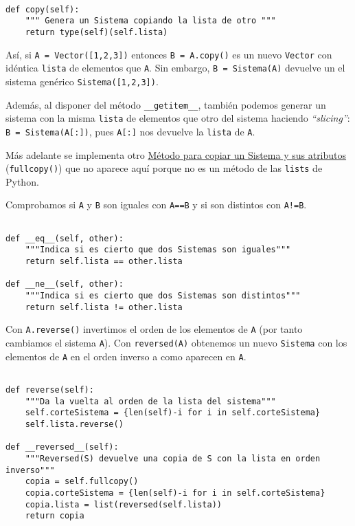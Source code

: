 \documentclass[11pt]{report}
\begin{document}
\begin{verbatim}

def copy(self):
    """ Genera un Sistema copiando la lista de otro """
    return type(self)(self.lista)

\end{verbatim}

Así, si \texttt{A = Vector([1,2,3])} entonces \texttt{B = A.copy()} es un nuevo \texttt{Vector} con idéntica \texttt{lista} de
elementos que \texttt{A}. Sin embargo, \texttt{B = Sistema(A)} devuelve un el sistema genérico \texttt{Sistema([1,2,3])}.

Además, al disponer del método \texttt{\_\_getitem\_\_}, también podemos generar un sistema con la misma
\texttt{lista} de elementos que otro del sistema haciendo \emph{``slicing''}: \texttt{B = Sistema(A[:])}, pues \texttt{A[:]}
nos devuelve la \texttt{lista} de \texttt{A}.

Más adelante se implementa otro \hyperref[sec:org95f5670]{Método para copiar un Sistema y sus atributos} (\texttt{fullcopy()}) que no
aparece aquí porque no es un método de las \texttt{lists} de Python.

\medskip

Comprobamos si \texttt{A} y \texttt{B} son iguales con \texttt{A==B} y si son distintos con \texttt{A!=B}.


\begin{verbatim}

def __eq__(self, other):
    """Indica si es cierto que dos Sistemas son iguales"""
    return self.lista == other.lista

def __ne__(self, other):
    """Indica si es cierto que dos Sistemas son distintos"""
    return self.lista != other.lista

\end{verbatim}

Con \texttt{A.reverse()} invertimos el orden de los elementos de \texttt{A} (por tanto cambiamos el sistema
\texttt{A}). Con \texttt{reversed(A)} obtenemos un nuevo \texttt{Sistema} con los elementos de \texttt{A} en el orden inverso a
como aparecen en \texttt{A}.


\begin{verbatim}

def reverse(self):
    """Da la vuelta al orden de la lista del sistema"""
    self.corteSistema = {len(self)-i for i in self.corteSistema}
    self.lista.reverse()
    
def __reversed__(self):
    """Reversed(S) devuelve una copia de S con la lista en orden inverso"""
    copia = self.fullcopy()
    copia.corteSistema = {len(self)-i for i in self.corteSistema}
    copia.lista = list(reversed(self.lista))
    return copia
    
\end{verbatim}
\end{document}
